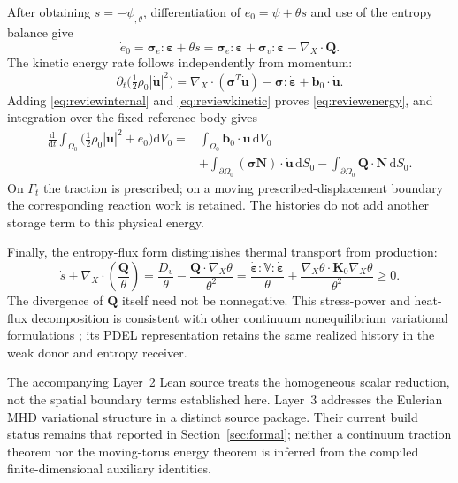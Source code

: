 \documentclass[11pt,a4paper]{article}
\theoremstyle{remark}\newtheorem{remark}{Remark}
\numberwithin{equation}{section}
\newcommand{\dd}{\mathrm{d}}
\newcommand{\grad}{\nabla}
\begin{document}
After obtaining $s=-\psi_{,\theta}$, differentiation of $e_0=\psi+\theta s$ and use of the entropy balance give
\begin{equation}
\dot e_0
=\boldsymbol\sigma_e:\dot{\boldsymbol\varepsilon}+\theta\dot s
=\boldsymbol\sigma_e:\dot{\boldsymbol\varepsilon}
+\boldsymbol\sigma_v:\dot{\boldsymbol\varepsilon}
-\grad_X\!\cdot\boldsymbol Q.
\label{eq:reviewinternal}
\end{equation}
The kinetic energy rate follows independently from momentum:
\begin{equation}
\partial_t\big(\tfrac12\rho_0|\dot{\boldsymbol u}|^2\big)
=\grad_X\!\cdot(\boldsymbol\sigma^T\dot{\boldsymbol u})
-\boldsymbol\sigma:\dot{\boldsymbol\varepsilon}
+\boldsymbol b_0\cdot\dot{\boldsymbol u}.
\label{eq:reviewkinetic}
\end{equation}
Adding \eqref{eq:reviewinternal} and \eqref{eq:reviewkinetic} proves \eqref{eq:reviewenergy}, and integration over the fixed reference body gives
\begin{equation}
\begin{aligned}
\frac{\dd}{\dd t}\int_{\Omega_0}
\big(\tfrac12\rho_0|\dot{\boldsymbol u}|^2+e_0\big)\dd V_0
={}&\int_{\Omega_0}\boldsymbol b_0\cdot\dot{\boldsymbol u}\,\dd V_0\\
&+\int_{\partial\Omega_0}
(\boldsymbol\sigma\boldsymbol N)\cdot\dot{\boldsymbol u}\,\dd S_0
-\int_{\partial\Omega_0}\boldsymbol Q\cdot\boldsymbol N\,\dd S_0.
\end{aligned}
\label{eq:reviewboundarybudget}
\end{equation}
On $\Gamma_t$ the traction is prescribed; on a moving prescribed-displacement boundary the corresponding reaction work is retained. The histories do not add another storage term to this physical energy.

Finally, the entropy-flux form distinguishes thermal transport from production:
\begin{equation}
\dot s+\grad_X\!\cdot\left(\frac{\boldsymbol Q}{\theta}\right)
=\frac{D_v}{\theta}-\frac{\boldsymbol Q\cdot\grad_X\theta}{\theta^2}
=\frac{\dot{\boldsymbol\varepsilon}:\mathbb V:\dot{\boldsymbol\varepsilon}}{\theta}
+\frac{\grad_X\theta\cdot\boldsymbol K_0\grad_X\theta}{\theta^2}\ge0.
\label{eq:reviewentropyflux}
\end{equation}
The divergence of $\boldsymbol Q$ itself need not be nonnegative. This stress-power and heat-flux decomposition is consistent with other continuum nonequilibrium variational formulations \citep{GayBalmaz2017b}; its PDEL representation retains the same realized history in the weak donor and entropy receiver.

The accompanying Layer~2 Lean source treats the homogeneous scalar reduction, not the spatial boundary terms established here. Layer~3 addresses the Eulerian MHD variational structure in a distinct source package. Their current build status remains that reported in Section~\ref{sec:formal}; neither a continuum traction theorem nor the moving-torus energy theorem is inferred from the compiled finite-dimensional auxiliary identities.


\FloatBarrier
\begingroup\small
\setlength{\bibsep}{2.5pt}


\endgroup
\end{document}
